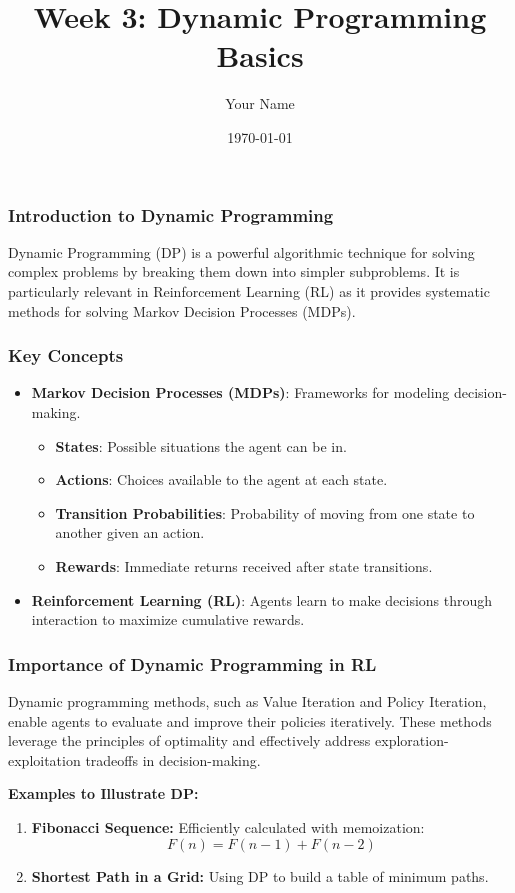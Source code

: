 \documentclass{beamer}
\title{Week 3: Dynamic Programming Basics}
\author{Your Name}
\institute{Your Institution}
\date{\today}
\begin{document}
\frame{\titlepage}

\begin{frame}[fragile]
    \frametitle{Introduction to Dynamic Programming}
    Dynamic Programming (DP) is a powerful algorithmic technique for solving complex problems by breaking them down into simpler subproblems. It is particularly relevant in Reinforcement Learning (RL) as it provides systematic methods for solving Markov Decision Processes (MDPs).
\end{frame}

\begin{frame}[fragile]
    \frametitle{Key Concepts}
    \begin{itemize}
        \item \textbf{Markov Decision Processes (MDPs)}: Frameworks for modeling decision-making.
        \begin{itemize}
            \item \textbf{States}: Possible situations the agent can be in.
            \item \textbf{Actions}: Choices available to the agent at each state.
            \item \textbf{Transition Probabilities}: Probability of moving from one state to another given an action.
            \item \textbf{Rewards}: Immediate returns received after state transitions.
        \end{itemize}
        \item \textbf{Reinforcement Learning (RL)}: Agents learn to make decisions through interaction to maximize cumulative rewards.
    \end{itemize}
\end{frame}

\begin{frame}[fragile]
    \frametitle{Importance of Dynamic Programming in RL}
    Dynamic programming methods, such as Value Iteration and Policy Iteration, enable agents to evaluate and improve their policies iteratively. These methods leverage the principles of optimality and effectively address exploration-exploitation tradeoffs in decision-making.

    \textbf{Examples to Illustrate DP:}
    \begin{enumerate}
        \item \textbf{Fibonacci Sequence:} Efficiently calculated with memoization:
        \begin{equation}
        F(n) = F(n-1) + F(n-2)
        \end{equation}
        \item \textbf{Shortest Path in a Grid:} Using DP to build a table of minimum paths.
    \end{enumerate}
\end{frame}
\end{document}
